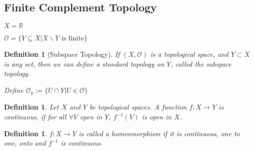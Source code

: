 \documentclass[twoside]{article}
\newcommand{\TO}{\mathcal O}
\newtheorem{definition}[theorem]{Definition}
\newcommand\R{\mathbb{R}}
\begin{document}
    \subsection{Finite Complement Topology}

    $X = \R$

    $\TO = \{Y \subseteq X \vert X \backslash Y \text{ is finite}\}$ 

    \begin{definition}[Subspace Topology]
        If $(X, \TO)$ is a topological space, and $Y \subset X$ is any set, then we can define a standard topology on $Y$, called the subspace topology. 

        Define $\TO_y := \{U \cap Y \vert U \in \TO\}$
    \end{definition}

    \begin{definition}
        Let $X$ and $Y$ be topological spaces. A function $f: X \rightarrow Y$ is continuous, if for all $\forall V$ open in $Y$, $f^{-1}(V)$ is open in $X$.         
    \end{definition}

    \begin{definition}
        $f:X \rightarrow Y$ is called a homeomorphism if it is continuous, one to one, onto and $f^{-1}$ is continuous.
    \end{definition}
\end{document}
